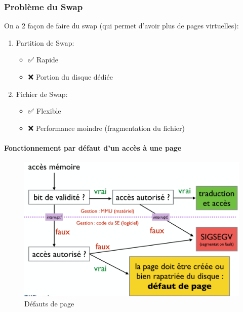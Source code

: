 \subsubsection{Problème du Swap}\label{probluxe8me-du-swap}

On a 2 façon de faire du swap (qui permet d'avoir plus de pages
virtuelles):

\begin{enumerate}
\def\labelenumi{\arabic{enumi}.}
\tightlist
\item
  Partition de Swap:

  \begin{itemize}
  \tightlist
  \item
    ✅ Rapide
  \item
    ❌ Portion du disque dédiée
  \end{itemize}
\item
  Fichier de Swap:

  \begin{itemize}
  \tightlist
  \item
    ✅ Flexible
  \item
    ❌ Performance moindre (fragmentation du fichier)
  \end{itemize}
\end{enumerate}

\paragraph{Fonctionnement par défaut d'un accès à une
page}\label{fonctionnement-par-duxe9faut-dun-accuxe8s-uxe0-une-page}

\begin{figure}
\centering
\includegraphics{image-57.png}
\caption{Défauts de page}
\end{figure}

